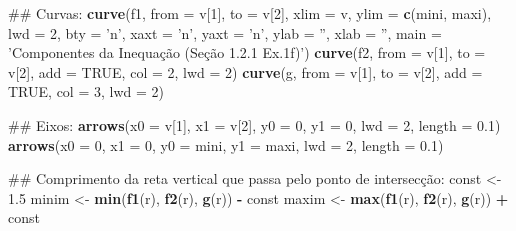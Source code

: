 \documentclass[]{book}
\newenvironment{Shaded}{\begin{snugshade}}{\end{snugshade}}
\newcommand{\KeywordTok}[1]{\textcolor[rgb]{0.13,0.29,0.53}{\textbf{#1}}}
\newcommand{\DataTypeTok}[1]{\textcolor[rgb]{0.13,0.29,0.53}{#1}}
\newcommand{\DecValTok}[1]{\textcolor[rgb]{0.00,0.00,0.81}{#1}}
\newcommand{\FloatTok}[1]{\textcolor[rgb]{0.00,0.00,0.81}{#1}}
\newcommand{\StringTok}[1]{\textcolor[rgb]{0.31,0.60,0.02}{#1}}
\newcommand{\OtherTok}[1]{\textcolor[rgb]{0.56,0.35,0.01}{#1}}
\newcommand{\OperatorTok}[1]{\textcolor[rgb]{0.81,0.36,0.00}{\textbf{#1}}}
\newcommand{\NormalTok}[1]{#1}
\begin{document}
\begin{enumerate}
\begin{Shaded}
\begin{Highlighting}[]
\NormalTok{##  Curvas:}
\KeywordTok{curve}\NormalTok{(f1, }\DataTypeTok{from =}\NormalTok{ v[}\DecValTok{1}\NormalTok{], }\DataTypeTok{to =}\NormalTok{ v[}\DecValTok{2}\NormalTok{], }\DataTypeTok{xlim =}\NormalTok{ v, }\DataTypeTok{ylim =} \KeywordTok{c}\NormalTok{(mini, maxi), }\DataTypeTok{lwd =} \DecValTok{2}\NormalTok{,}
  \DataTypeTok{bty =} \StringTok{'n'}\NormalTok{, }\DataTypeTok{xaxt =} \StringTok{'n'}\NormalTok{, }\DataTypeTok{yaxt =} \StringTok{'n'}\NormalTok{, }\DataTypeTok{ylab =} \StringTok{''}\NormalTok{, }\DataTypeTok{xlab =} \StringTok{''}\NormalTok{,}
  \DataTypeTok{main =} \StringTok{'Componentes da Inequação (Seção 1.2.1 Ex.1f)'}\NormalTok{)}
\KeywordTok{curve}\NormalTok{(f2, }\DataTypeTok{from =}\NormalTok{ v[}\DecValTok{1}\NormalTok{], }\DataTypeTok{to =}\NormalTok{ v[}\DecValTok{2}\NormalTok{], }\DataTypeTok{add =} \OtherTok{TRUE}\NormalTok{, }\DataTypeTok{col =} \DecValTok{2}\NormalTok{, }\DataTypeTok{lwd =} \DecValTok{2}\NormalTok{)}
\KeywordTok{curve}\NormalTok{(g, }\DataTypeTok{from =}\NormalTok{ v[}\DecValTok{1}\NormalTok{], }\DataTypeTok{to =}\NormalTok{ v[}\DecValTok{2}\NormalTok{], }\DataTypeTok{add =} \OtherTok{TRUE}\NormalTok{, }\DataTypeTok{col =} \DecValTok{3}\NormalTok{, }\DataTypeTok{lwd =} \DecValTok{2}\NormalTok{)}

\NormalTok{##  Eixos:}
\KeywordTok{arrows}\NormalTok{(}\DataTypeTok{x0 =}\NormalTok{ v[}\DecValTok{1}\NormalTok{], }\DataTypeTok{x1 =}\NormalTok{ v[}\DecValTok{2}\NormalTok{],}
   \DataTypeTok{y0 =} \DecValTok{0}\NormalTok{, }\DataTypeTok{y1 =} \DecValTok{0}\NormalTok{, }\DataTypeTok{lwd =} \DecValTok{2}\NormalTok{, }\DataTypeTok{length =} \FloatTok{0.1}\NormalTok{)}
\KeywordTok{arrows}\NormalTok{(}\DataTypeTok{x0 =} \DecValTok{0}\NormalTok{, }\DataTypeTok{x1 =} \DecValTok{0}\NormalTok{,}
   \DataTypeTok{y0 =}\NormalTok{ mini, }\DataTypeTok{y1 =}\NormalTok{ maxi, }\DataTypeTok{lwd =} \DecValTok{2}\NormalTok{, }\DataTypeTok{length =} \FloatTok{0.1}\NormalTok{)}

\NormalTok{##  Comprimento da reta vertical que passa pelo ponto de intersecção:}
\NormalTok{const <-}\StringTok{ }\FloatTok{1.5}
\NormalTok{minim <-}\StringTok{ }\KeywordTok{min}\NormalTok{(}\KeywordTok{f1}\NormalTok{(r), }\KeywordTok{f2}\NormalTok{(r), }\KeywordTok{g}\NormalTok{(r)) }\OperatorTok{-}\StringTok{ }\NormalTok{const}
\NormalTok{maxim <-}\StringTok{ }\KeywordTok{max}\NormalTok{(}\KeywordTok{f1}\NormalTok{(r), }\KeywordTok{f2}\NormalTok{(r), }\KeywordTok{g}\NormalTok{(r)) }\OperatorTok{+}\StringTok{ }\NormalTok{const}


\end{Highlighting}
\end{Shaded}
\end{enumerate}
\end{document}
